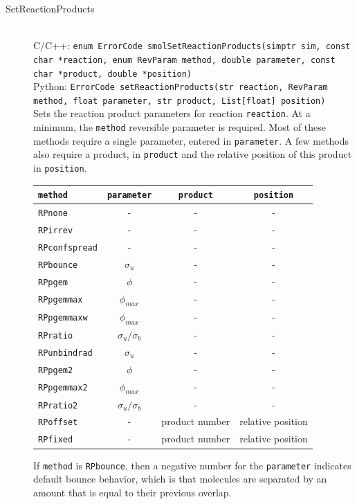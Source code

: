 \documentclass {scrbook}
\newcommand {\ttt} {\texttt}
\begin{document}
\begin{description}
\item[SetReactionProducts]
\hfill \\
C/C++: \ttt{enum ErrorCode smolSetReactionProducts(simptr sim, const char *reaction, enum RevParam method, double parameter, const char *product, double *position)}\\
Python: \ttt{ErrorCode setReactionProducts(str reaction, RevParam method, float parameter, str product, List[float] position)}\\
Sets the reaction product parameters for reaction \ttt{reaction}. At a minimum, the \ttt{method} reversible parameter is required. Most of these methods require a single parameter, entered in \ttt{parameter}. A few methods also require a product, in \ttt{product} and the relative position of this product in \ttt{position}.

\begin{longtable}[c]{lccc}
\ttt{method} & \ttt{parameter} & \ttt{product} & \ttt{position}\\
\hline
\ttt{RPnone} & - & - & -\\
\ttt{RPirrev} & - & - & -\\
\ttt{RPconfspread} & - & - & -\\
\ttt{RPbounce} & $\sigma_u$ & - & -\\
\ttt{RPpgem} & $\phi$ & - & -\\
\ttt{RPpgemmax} & $\phi_{max}$ & - & -\\
\ttt{RPpgemmaxw} & $\phi_{max}$ & - & -\\
\ttt{RPratio} & $\sigma_u/\sigma_b$ & - & -\\
\ttt{RPunbindrad} & $\sigma_u$ & - & -\\
\ttt{RPpgem2} & $\phi$ & - & -\\
\ttt{RPpgemmax2} & $\phi_{max}$ & - & -\\
\ttt{RPratio2} & $\sigma_u/\sigma_b$ & - & -\\
\ttt{RPoffset} & - & product number & relative position\\
\ttt{RPfixed} & - & product number & relative position\\
\end{longtable}

If \ttt{method} is \ttt{RPbounce}, then a negative number for the \ttt{parameter} indicates default bounce behavior, which is that molecules are separated by an amount that is equal to their previous overlap.

\end{description}
\end{document}
